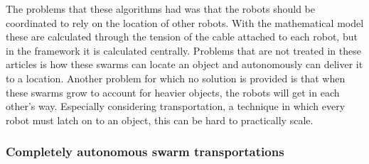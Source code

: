 The problems that these algorithms had was that the robots should be coordinated to rely on the location of other robots.
With the mathematical model these are calculated through the tension of the cable attached to each robot, but in the framework it is calculated centrally. 
Problems that are not treated in these articles is how these swarms can locate an object and autonomously can deliver it to a location. 
Another problem for which no solution is provided is that when these swarms grow to account for heavier objects, the robots will get in each other's way. 
Especially considering transportation, a technique in which every robot must latch on to an object, this can be hard to practically scale. 

\subsubsection{Completely autonomous swarm transportations}